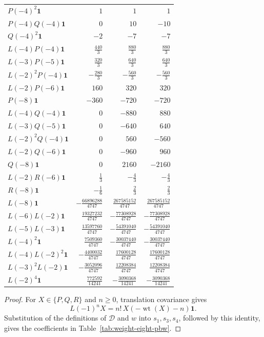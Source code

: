 \documentclass[11pt]{amsart}
\numberwithin{equation}{section}
\theoremstyle{definition}
\theoremstyle{remark}
\newcommand{\wt}{\operatorname{wt}}
\begin{document}
\begin{longtable}{@{}lrrr@{}}
$P(-4)^2\mathbf1$
& $1$ & $1$ & $1$\\
$P(-4)Q(-4)\mathbf1$
& $0$ & $10$ & $-10$\\
$Q(-4)^2\mathbf1$
& $-2$ & $-7$ & $-7$\\
$L(-4)P(-4)\mathbf1$
& $\frac{440}{3}$ & $\frac{880}{3}$ & $\frac{880}{3}$\\
$L(-3)P(-5)\mathbf1$
& $\frac{320}{3}$ & $\frac{640}{3}$ & $\frac{640}{3}$\\
$L(-2)^2P(-4)\mathbf1$
& $-\frac{280}{3}$ & $-\frac{560}{3}$ & $-\frac{560}{3}$\\
$L(-2)P(-6)\mathbf1$
& $160$ & $320$ & $320$\\
$P(-8)\mathbf1$
& $-360$ & $-720$ & $-720$\\
$L(-4)Q(-4)\mathbf1$
& $0$ & $-880$ & $880$\\
$L(-3)Q(-5)\mathbf1$
& $0$ & $-640$ & $640$\\
$L(-2)^2Q(-4)\mathbf1$
& $0$ & $560$ & $-560$\\
$L(-2)Q(-6)\mathbf1$
& $0$ & $-960$ & $960$\\
$Q(-8)\mathbf1$
& $0$ & $2160$ & $-2160$\\
$L(-2)R(-6)\mathbf1$
& $\frac13$ & $-\frac43$ & $-\frac43$\\
$R(-8)\mathbf1$
& $-\frac16$ & $\frac23$ & $\frac23$\\
$L(-8)\mathbf1$
& $-\frac{66896288}{4747}$
& $\frac{267585152}{4747}$
& $\frac{267585152}{4747}$\\
$L(-6)L(-2)\mathbf1$
& $\frac{19327232}{4747}$
& $-\frac{77308928}{4747}$
& $-\frac{77308928}{4747}$\\
$L(-5)L(-3)\mathbf1$
& $\frac{13597760}{4747}$
& $-\frac{54391040}{4747}$
& $-\frac{54391040}{4747}$\\
$L(-4)^2\mathbf1$
& $\frac{7509360}{4747}$
& $-\frac{30037440}{4747}$
& $-\frac{30037440}{4747}$\\
$L(-4)L(-2)^2\mathbf1$
& $-\frac{4400032}{4747}$
& $\frac{17600128}{4747}$
& $\frac{17600128}{4747}$\\
$L(-3)^2L(-2)\mathbf1$
& $-\frac{3052096}{4747}$
& $\frac{12208384}{4747}$
& $\frac{12208384}{4747}$\\
$L(-2)^4\mathbf1$
& $\frac{772592}{14241}$
& $-\frac{3090368}{14241}$
& $-\frac{3090368}{14241}$\\

\end{longtable}
\endgroup

\begin{proof}
For $X\in\{P,Q,R\}$ and $n\geq0$, translation covariance gives
\[
 L(-1)^nX=n!\,X(-\wt(X)-n)\mathbf1.
\]
Substitution of the definitions of $\mathcal D$ and $w$
into $s_1,s_3,s_4$, followed by this identity, gives the
coefficients in Table~\ref{tab:weight-eight-pbw}.
\end{proof}
\end{document}

